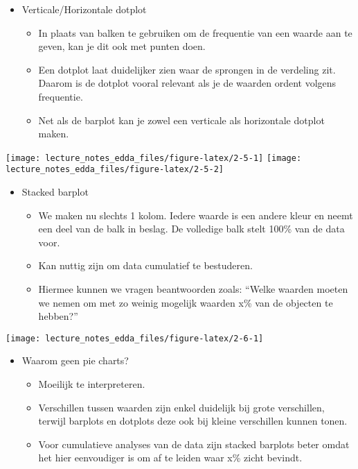 \documentclass[]{memoir}
\providecommand{\tightlist}{%
  \setlength{\itemsep}{0pt}\setlength{\parskip}{0pt}}
\begin{document}
\begin{itemize}
\tightlist
\item
  Verticale/Horizontale dotplot

  \begin{itemize}
  \tightlist
  \item
    In plaats van balken te gebruiken om de frequentie van een waarde aan te geven, kan je dit ook met punten doen.
  \item
    Een dotplot laat duidelijker zien waar de sprongen in de verdeling zit. Daarom is de dotplot vooral relevant als je de waarden ordent volgens frequentie.
  \item
    Net als de barplot kan je zowel een verticale als horizontale dotplot maken.
  \end{itemize}
\end{itemize}

\texttt{[image: lecture\_notes\_edda\_files/figure-latex/2-5-1]}
\texttt{[image: lecture\_notes\_edda\_files/figure-latex/2-5-2]}

\begin{itemize}
\tightlist
\item
  Stacked barplot

  \begin{itemize}
  \tightlist
  \item
    We maken nu slechts 1 kolom. Iedere waarde is een andere kleur en neemt een deel van de balk in beslag. De volledige balk stelt 100\% van de data voor.
  \item
    Kan nuttig zijn om data cumulatief te bestuderen.
  \item
    Hiermee kunnen we vragen beantwoorden zoals: ``Welke waarden moeten we nemen om met zo weinig mogelijk waarden x\% van de objecten te hebben?''
  \end{itemize}
\end{itemize}

\texttt{[image: lecture\_notes\_edda\_files/figure-latex/2-6-1]}

\begin{itemize}
\tightlist
\item
  Waarom geen pie charts?

  \begin{itemize}
  \tightlist
  \item
    Moeilijk te interpreteren.
  \item
    Verschillen tussen waarden zijn enkel duidelijk bij grote verschillen, terwijl barplots en dotplots deze ook bij kleine verschillen kunnen tonen.
  \item
    Voor cumulatieve analyses van de data zijn stacked barplots beter omdat het hier eenvoudiger is om af te leiden waar x\% zicht bevindt.
  \end{itemize}
\end{itemize}
\end{document}
